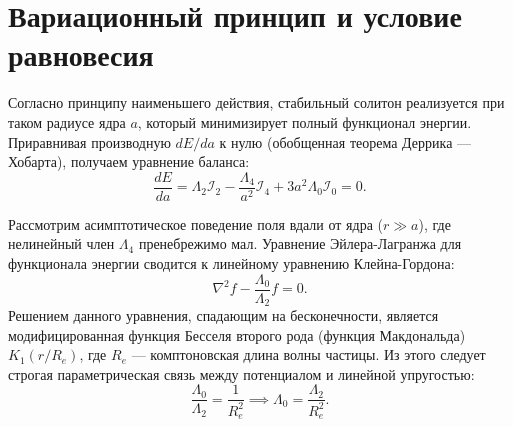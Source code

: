 \documentclass[12pt,a4paper]{article}
\begin{document}
\section{Вариационный принцип и условие равновесия}
Согласно принципу наименьшего действия, стабильный солитон реализуется при таком радиусе ядра $a$, который минимизирует полный функционал энергии. Приравнивая производную $dE/da$ к нулю (обобщенная теорема Деррика — Хобарта), получаем уравнение баланса:
\begin{equation}
\frac{dE}{da} = \Lambda_2 \mathcal{I}_2 - \frac{\Lambda_4}{a^2} \mathcal{I}_4 + 3a^2 \Lambda_0 \mathcal{I}_0 = 0.
\label{eq:virial}
\end{equation}

Рассмотрим асимптотическое поведение поля вдали от ядра ($r \gg a$), где нелинейный член $\Lambda_4$ пренебрежимо мал. Уравнение Эйлера-Лагранжа для функционала энергии сводится к линейному уравнению Клейна-Гордона:
\begin{equation}
\nabla^2 f - \frac{\Lambda_0}{\Lambda_2} f = 0.
\end{equation}
Решением данного уравнения, спадающим на бесконечности, является модифицированная функция Бесселя второго рода (функция Макдональда) $K_1(r/R_e)$, где $R_e$ — комптоновская длина волны частицы. Из этого следует строгая параметрическая связь между потенциалом и линейной упругостью:
\begin{equation}
\frac{\Lambda_0}{\Lambda_2} = \frac{1}{R_e^2} \implies \Lambda_0 = \frac{\Lambda_2}{R_e^2}.
\label{eq:asymptotic}
\end{equation}
\end{document}
